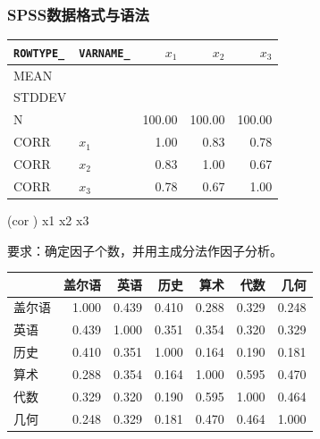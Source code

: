 \subsubsection{SPSS数据格式与语法}
\begin{center}\begin{tabular}{llrrr}\toprule
{\bfseries \texttt{ROWTYPE\_}}&{\bfseries \texttt{VARNAME\_}}&{\bfseries $x_1$}&{\bfseries $x_2$}&{\bfseries $x_3$}\\\midrule
MEAN&&&&\\
STDDEV&&&&\\
N&&100.00&100.00&100.00\\
CORR&$x_1$&1.00&0.83&0.78\\
CORR&$x_2$&0.83&1.00&0.67\\
CORR&$x_3$&0.78&0.67&1.00\\\bottomrule
\end{tabular}\end{center}
\begin{code}
 \ROperator{/}  (cor \ROperator{=} \ROperator{*})
 \ROperator{/} x1 x2 x3
 \ROperator{/} 
 \ROperator{/} 
\end{code}
要求：确定因子个数，并用主成分法作因子分析。
\par\addvspace{5pt}\begin{center}\begin{minipage}{\linewidth}\centering
\small
{}\label{tab:six}
\begin{tabular}{lrrrrrr}\toprule
 &{\bfseries  盖尔语 }&{\bfseries  英语 }&{\bfseries  历史 }&{\bfseries  算术 }&{\bfseries  代数 }&{\bfseries  几何}\\\midrule
盖尔语 & 1.000 & 0.439 & 0.410 & 0.288 & 0.329 & 0.248\\
英语 & 0.439 & 1.000 & 0.351 & 0.354 & 0.320 & 0.329\\
历史 & 0.410 & 0.351 & 1.000 & 0.164 & 0.190 & 0.181\\
算术 & 0.288 & 0.354 & 0.164 & 1.000 & 0.595 & 0.470\\
代数 & 0.329 & 0.320 & 0.190 & 0.595 & 1.000 & 0.464\\
几何 & 0.248 & 0.329 & 0.181 & 0.470 & 0.464 & 1.000\\
\bottomrule\end{tabular}
\end{minipage}\end{center}

